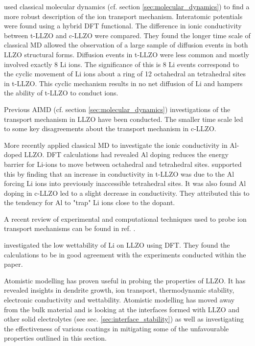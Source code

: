\documentclass[../main.tex]{subfiles}
\begin{document}
\citeauthor{Burbano2016} used classical molecular dynamics (cf. section \ref{sec:molecular_dynamics}) to find a more robust description of the ion transport mechanism.\cite{Burbano2016} Interatomic potentials were found using a hybrid DFT functional. The difference in ionic conductivity between t-LLZO and c-LLZO were compared. They found the longer time scale of classical MD allowed the observation of a large sample of diffusion events in both LLZO structural forms. Diffusion events in t-LLZO were less common and mostly involved exactly 8 Li ions. The significance of this is 8 Li events correspond to the cyclic movement of Li ions about a ring of 12 octahedral an tetrahedral sites in t-LLZO. This cyclic mechanism results in no net diffusion of Li and hampers the ability of t-LLZO to conduct ions.

Previous AIMD (cf. section \ref{sec:molecular_dynamics}) investigations of the transport mechanism in LLZO have been conducted. The smaller time scale led to some key disagreements about the transport mechanism in c-LLZO.\cite{Meier2014, Jalem2013, Burbano2016}

More recently \citeauthor{Bonilla2019} applied classical MD to investigate the ionic conductivity in Al-doped LLZO.\cite{Bonilla2019} DFT calculations had revealed Al doping reduces the energy barrier for Li-ions to move between octahedral and tetrahedral sites.\cite{Rettenwander2014, Rettenwander2016} \citeauthor{Bonilla2019} supported this by finding that an increase in conductivity in t-LLZO was due to the Al forcing Li ions into previously inaccessible tetrahedral sites. It was also found Al doping in c-LLZO led to a slight decrease in conductivity. They attributed this to the tendency for Al to "trap" Li ions close to the dopant.

A recent review of experimental and computational techniques used to probe ion transport mechanisms can be found in ref. .

\citeauthor{Sharafi2017} investigated the low wettability of Li on LLZO using DFT.\cite{Sharafi2017} They found the calculations to be in good agreement with the experiments conducted within the paper.

Atomistic modelling has proven useful in probing the properties of LLZO. It has revealed insights in dendrite growth, ion transport, thermodynamic stability, electronic conductivity and wettability. Atomistic modelling has moved away from the bulk material and is looking at the interfaces formed with LLZO and other solid electrolytes (see sec. \ref{sec:interface_stability}) as well as investigating the effectiveness of various coatings in mitigating some of the unfavourable properties outlined in this section. 
\end{document}
